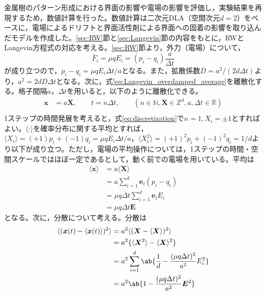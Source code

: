 \documentclass[autodetect-engine,dvi=dvipdfmx,a4paper,ja=standard,oneside,openany,11pt]{bxjsbook}
\begin{document}
金属樹のパターン形成における界面の影響や電場の影響を評価し，実験結果を再現するため，数値計算を行った。数値計算は二次元DLA（空間次元$d=2$）をベースに，電場によるドリフトと界面活性剤による界面への固着の影響を取り込んだモデルを作成した。\ref{sec:RW}節と\ref{sec:Langevin}節の内容をもとに，RWとLangevin方程式の対応を考える。\ref{sec:RW}節より，外力（電場）について，
\begin{equation}
  \bar{F}_i=\mu q E_i=(p_i-q_i)\frac{a}{\Delta t}
  \label{eq:force}
\end{equation}が成り立つので，$p_i-q_i=\mu q E_i\Delta t/a$となる。また，拡散係数$D=a^2/(2d\Delta t)$より，$a^2=2dD\Delta t$となる。次に，式\eqref{eq:Langevin_overdamped_average}を離散化する。格子間隔$a$，$\Delta t$を用いると，以下のように離散化できる。
\begin{equation}
  \begin{split}
    \bm{x} & =a\bm{X}, \qquad t=n\Delta t, \qquad (n\in\mathbb{N},\bm{X}\in\mathbb{Z}^d,a,\Delta t \in \mathbb{R}) \\
    \label{eq:discretization}
  \end{split}
\end{equation}
1ステップの時間発展を考えると，式\eqref{eq:discretization}で$n=1,X_i=\pm1$とすればよい。$\langle\cdot\rangle$を確率分布に関する平均とすれば，$\langle X_i\rangle=(+1)p_i+(-1)q_i=\mu q E_i\Delta t/a$，$\langle X_i^2\rangle=(+1)^2p_i+(-1)^2q_i=1/d$より以下が成り立つ。ただし，電場の平均操作については，1ステップの時間・空間スケールではほぼ一定であるとして，動く前での電場を用いている。平均は
\begin{equation}
  \begin{split}
    \langle\bm{x}\rangle & =a\langle\bm{X}\rangle                     \\
                         & =a\sum_{i=1}^{d}\bm{e}_i(p_i-q_i)          \\
                         & =\mu q \Delta t\sum_{i=1}^{d} \bm{e}_i E_i \\
                         & =\mu q \Delta t\bm{E}
  \end{split}
  \label{eq:discrete_average}
\end{equation}
となる。次に，分散について考える。分散は
\begin{equation}
  \begin{aligned}
    \langle(\bm{x}(t)-\langle\bm{x}(t)\rangle)^2\rangle
     & =a^2\langle(\bm{X}-\langle\bm{X}\rangle)^2\rangle                        \\
     & =a^2\{\langle\bm{X}^2\rangle-\langle\bm{X}\rangle^2\}                    \\
     & =a^2\sum_{i=1}^{d}\ab\{\frac{1}{d}-\frac{(\mu q \Delta t)^2}{a^2}E_i^2\} \\
     & =a^2\ab\{1-\frac{(\mu q \Delta t)^2}{a^2}\bm{E}^2\}                      \\
  \end{aligned}
  \label{eq:discrete_variance_3_2}
\end{equation}
\end{document}
